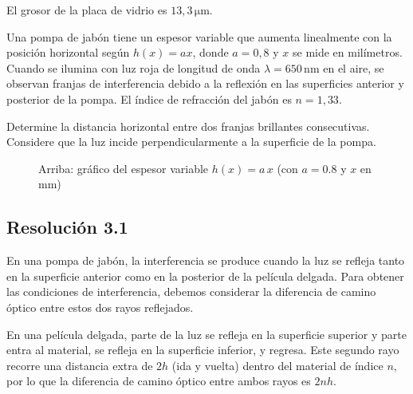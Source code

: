 \documentclass[
  11pt,
  letterpaper,
   addpoints,
   answers
  ]{exam}
\begin{document}
\begin{questions}
\begin{solution}
El grosor de la placa de vidrio es $\boxed{13{,}3\,\mathrm{\mu m}}$.

\end{solution}
\question Una pompa de jabón tiene un espesor variable que aumenta linealmente con la posición horizontal según $h(x) = ax$, donde $a = 0{,}8$ y $x$ se mide en milímetros. Cuando se ilumina con luz roja de longitud de onda $\lambda = 650\,\mathrm{nm}$ en el aire, se observan franjas de interferencia debido a la reflexión en las superficies anterior y posterior de la pompa. El índice de refracción del jabón es $n = 1{,}33$.

Determine la distancia horizontal entre dos franjas brillantes consecutivas. Considere que la luz incide perpendicularmente a la superficie de la pompa.
\begin{figure}[H]
\centering
{}
\caption{Arriba: gráfico del espesor variable $h(x)=a\,x$ (con $a=0.8$ y $x$ en mm)}
\end{figure}


\begin{solution}
    \subsection*{Resolución 3.1 }

En una pompa de jabón, la interferencia se produce cuando la luz se refleja tanto en la superficie anterior como en la posterior de la película delgada. Para obtener las condiciones de interferencia, debemos considerar la diferencia de camino óptico entre estos dos rayos reflejados.

En una película delgada, parte de la luz se refleja en la superficie superior y parte entra al material, se refleja en la superficie inferior, y regresa. Este segundo rayo recorre una distancia extra de $2h$ (ida y vuelta) dentro del material de índice $n$, por lo que la diferencia de camino óptico entre ambos rayos es $2nh$.


\end{solution}
\end{questions}
\end{document}
